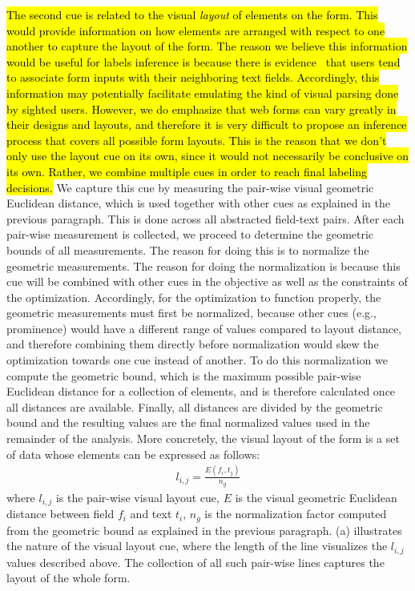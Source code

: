 \hl{The second cue is related to the visual \mbox{\emph{layout}} of elements 
on the form. This would provide information on how elements 
are arranged with respect to one another to capture the layout of the form. 
The reason we believe this information would be useful for labels inference 
is because there is evidence~\mbox{\cite{bargas2010simple, wroblewski2008web}} 
that users tend to associate form inputs with their neighboring text fields. 
Accordingly, this information may potentially facilitate emulating 
the kind of visual parsing done by sighted users.  
However, we do emphasize that web forms can vary greatly in their designs and 
layouts, and therefore it is very difficult to propose an inference process that covers 
all possible form layouts. This is the reason that we don't only use the layout 
cue on its own, since it would not necessarily be conclusive on its own. 
Rather, we combine multiple cues in order to reach final labeling decisions. }
We capture this cue by measuring the pair-wise visual geometric Euclidean distance, which is used together with other cues as explained in the previous paragraph. This is done across all abstracted field-text pairs. 
After each pair-wise measurement is collected, we proceed to determine 
the geometric bounds of all measurements. The reason for doing this 
is to normalize the geometric measurements. The reason for doing the normalization is because this cue will be combined with other cues in the objective as well as the constraints 
of the optimization. Accordingly, for the optimization to function properly, 
the geometric measurements must first be normalized, because other cues (e.g., prominence) would have a different range of values 
compared to layout distance, and therefore combining them directly before normalization would skew the optimization towards one cue instead of another. To do this normalization we compute the geometric bound, which is the maximum possible pair-wise 
Euclidean distance for a collection of elements, and is therefore calculated 
once all distances are available. Finally, all distances are divided by 
the geometric bound and the resulting values are the final normalized 
values used in the remainder of the analysis. More concretely, the visual 
layout of the form is a set of data whose elements can be expressed as follows: 
\begin{align}
l_{i,j} = \frac{E(f_i, t_j)}{n_g} 
\end{align}
where $l_{i,j}$ is the pair-wise visual layout cue, 
$E$ is the visual geometric Euclidean distance between 
field $f_i$ and text $t_i$, $n_g$ is the normalization 
factor computed from the geometric bound as explained 
in the previous paragraph. 
(a) illustrates the nature of the visual layout cue, 
where the length of the line visualizes the $l_{i,j}$ values described above. 
The collection of all such pair-wise lines captures the layout of the whole 
form. 

